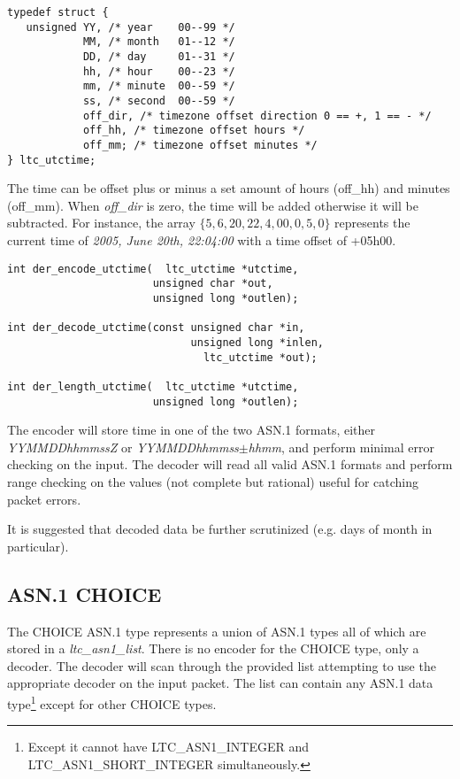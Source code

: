 \documentclass[synpaper]{book}
\begin{document}
\begin{verbatim}
typedef struct {
   unsigned YY, /* year    00--99 */
            MM, /* month   01--12 */
            DD, /* day     01--31 */
            hh, /* hour    00--23 */
            mm, /* minute  00--59 */
            ss, /* second  00--59 */
            off_dir, /* timezone offset direction 0 == +, 1 == - */
            off_hh, /* timezone offset hours */
            off_mm; /* timezone offset minutes */
} ltc_utctime;
\end{verbatim}

The time can be offset plus or minus a set amount of hours (off\_hh) and minutes (off\_mm).  When \textit{off\_dir} is zero, the time will be added otherwise it
will be subtracted.  For instance, the array $\lbrace 5, 6, 20, 22, 4, 00, 0, 5, 0 \rbrace$ represents the current time of
\textit{2005, June 20th, 22:04:00} with a time offset of +05h00.

\begin{verbatim}
int der_encode_utctime(  ltc_utctime *utctime,
                       unsigned char *out,
                       unsigned long *outlen);

int der_decode_utctime(const unsigned char *in,
                             unsigned long *inlen,
                               ltc_utctime *out);

int der_length_utctime(  ltc_utctime *utctime,
                       unsigned long *outlen);
\end{verbatim}

The encoder will store time in one of the two ASN.1 formats, either \textit{YYMMDDhhmmssZ} or \textit{YYMMDDhhmmss$\pm$hhmm}, and perform minimal error checking on the
input.  The decoder will read all valid ASN.1 formats and perform range checking on the values (not complete but rational) useful for catching packet errors.

It is suggested that decoded data be further scrutinized (e.g. days of month in particular).

\subsection{ASN.1 CHOICE}

The CHOICE ASN.1 type represents a union of ASN.1 types all of which are stored in a \textit{ltc\_asn1\_list}.  There is no encoder for the CHOICE type, only a
decoder.  The decoder will scan through the provided list attempting to use the appropriate decoder on the input packet.  The list can contain any ASN.1 data
type\footnote{Except it cannot have LTC\_ASN1\_INTEGER and LTC\_ASN1\_SHORT\_INTEGER simultaneously.} except for other CHOICE types.
\end{document}
